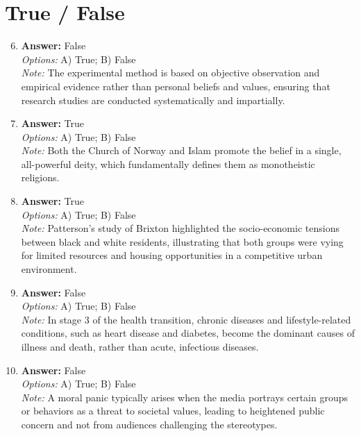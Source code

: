 \documentclass[12pt]{article}
\begin{document}
\section*{True / False}
\begin{enumerate}[label=\arabic*.]
\setcounter{enumi}{5}
\item \textbf{Answer:} False
\\ \textit{Options:} A) True; B) False
\\ \textit{Note:} The experimental method is based on objective observation and empirical evidence rather than personal beliefs and values, ensuring that research studies are conducted systematically and impartially.
\item \textbf{Answer:} True
\\ \textit{Options:} A) True; B) False
\\ \textit{Note:} Both the Church of Norway and Islam promote the belief in a single, all-powerful deity, which fundamentally defines them as monotheistic religions.
\item \textbf{Answer:} True
\\ \textit{Options:} A) True; B) False
\\ \textit{Note:} Patterson's study of Brixton highlighted the socio-economic tensions between black and white residents, illustrating that both groups were vying for limited resources and housing opportunities in a competitive urban environment.
\item \textbf{Answer:} False
\\ \textit{Options:} A) True; B) False
\\ \textit{Note:} In stage 3 of the health transition, chronic diseases and lifestyle-related conditions, such as heart disease and diabetes, become the dominant causes of illness and death, rather than acute, infectious diseases.
\item \textbf{Answer:} False
\\ \textit{Options:} A) True; B) False
\\ \textit{Note:} A moral panic typically arises when the media portrays certain groups or behaviors as a threat to societal values, leading to heightened public concern and not from audiences challenging the stereotypes.
\end{enumerate}
\end{document}
